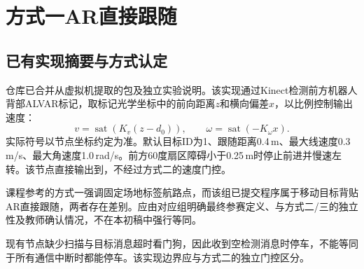 \section{方式一AR直接跟随}
\subsection{已有实现摘要与方式认定}
仓库已合并从虚拟机提取的包及独立实验说明\cite{follow1}。该实现通过Kinect检测前方机器人背部ALVAR标记，取标记光学坐标中的前向距离$z$和横向偏差$x$，以比例控制输出速度：
\begin{equation}
v=\operatorname{sat}\!\left(K_v(z-d_0)\right),\qquad
\omega=\operatorname{sat}\!\left(-K_\omega x\right).
\end{equation}
实际符号以节点坐标约定为准。默认目标ID为1、跟随距离0.4\,m、最大线速度0.3\,m/s、最大角速度1.0\,rad/s。前方60度扇区障碍小于0.25\,m时停止前进并慢速左转。该节点直接输出到，不经过方式二的速度门控。

课程参考的方式一强调固定场地标签航路点，而该组已提交程序属于移动目标背贴AR直接跟随，两者存在差别。应由对应组明确最终参赛定义、与方式二/三的独立性及教师确认情况，不在本初稿中强行等同。


现有节点缺少扫描与目标消息超时看门狗，因此收到空检测消息时停车，不能等同于所有通信中断时都能停车。该实现边界应与方式二的独立门控区分。
